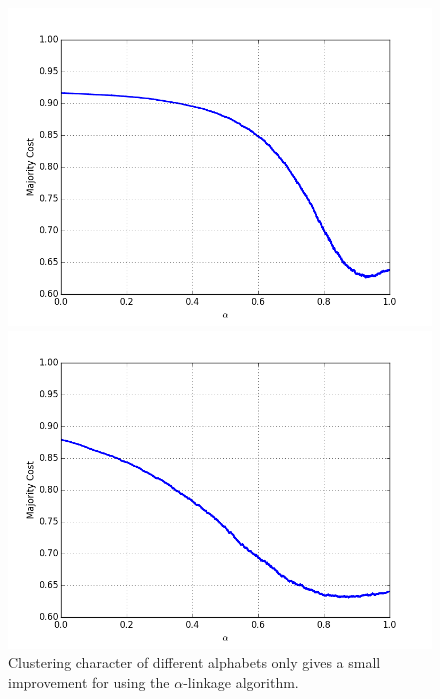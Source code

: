 \begin{figure}[h]
\centering
\begin{minipage}{.45\textwidth}
  \centering
  \includegraphics[width=\textwidth]{plots/omniglot-sc-average-inter}
\end{minipage}
\begin{minipage}{.45\textwidth}
  \centering
  \includegraphics[width=\textwidth]{plots/omniglot-ac-average-inter}
\end{minipage}
\caption{Clustering character of different alphabets only gives a small improvement for using the $\alpha$-linkage algorithm.}
\label{fig:omniglotinter}
\end{figure}


